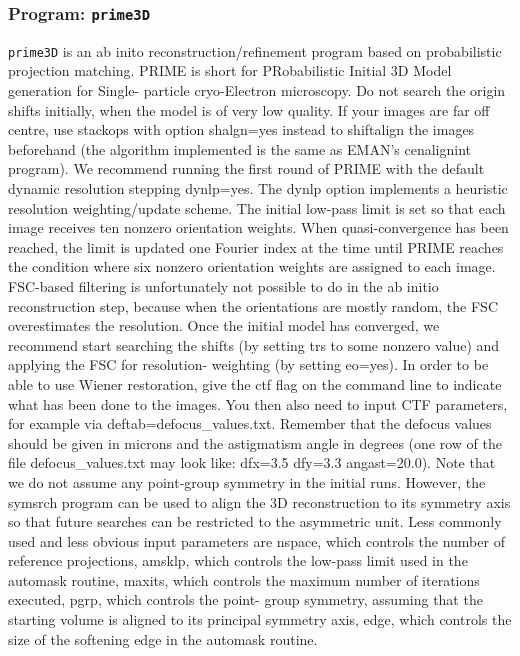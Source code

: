 \documentclass[a4paper,11pt]{article}
\newcommand{\prgname}[1]{\textcolor{NavyBlue}{\texttt{#1}}}
\begin{document}
\subsubsection{Program: \prgname{prime3D}}
\label{prime3D}
\prgname{prime3D} is an ab inito reconstruction/refinement program based on probabilistic projection matching. PRIME is short for PRobabilistic Initial 3D Model generation for Single- particle cryo-Electron microscopy. Do not search the origin shifts initially, when the model is of very low quality. If your images are far off centre, use stackops with option shalgn=yes instead to shiftalign the images beforehand (the algorithm implemented is the same as EMAN's cenalignint program). We recommend running the first round of PRIME with the default dynamic resolution stepping dynlp=yes. The dynlp option implements a heuristic resolution weighting/update scheme. The initial low-pass limit is set so that each image receives ten nonzero orientation weights. When quasi-convergence has been reached, the limit is updated one Fourier index at the time until PRIME reaches the condition where six nonzero orientation weights are assigned to each image. FSC-based filtering is unfortunately not possible to do in the ab initio reconstruction step, because when the orientations are mostly random, the FSC overestimates the resolution. Once the initial model has converged, we recommend start searching the shifts (by setting trs to some nonzero value) and applying the FSC for resolution- weighting (by setting eo=yes). In order to be able to use Wiener restoration, give the ctf flag on the command line to indicate what has been done to the images. You then also need to input CTF parameters, for example via deftab=defocus\_values.txt. Remember that the defocus values should be given in microns and the astigmatism angle in degrees (one row of the file defocus\_values.txt may look like: dfx=3.5 dfy=3.3 angast=20.0). Note that we do not assume any point-group symmetry in the initial runs. However, the symsrch program can be used to align the 3D reconstruction to its symmetry axis so that future searches can be restricted to the asymmetric unit. Less commonly used and less obvious input parameters are nspace, which  controls the number of reference projections, amsklp, which controls the low-pass limit used in the automask routine, maxits, which controls the maximum number of iterations executed, pgrp, which controls the point- group symmetry, assuming that the starting volume is aligned to its principal symmetry axis, edge, which controls the size of the softening edge in the automask routine.
\end{document}
